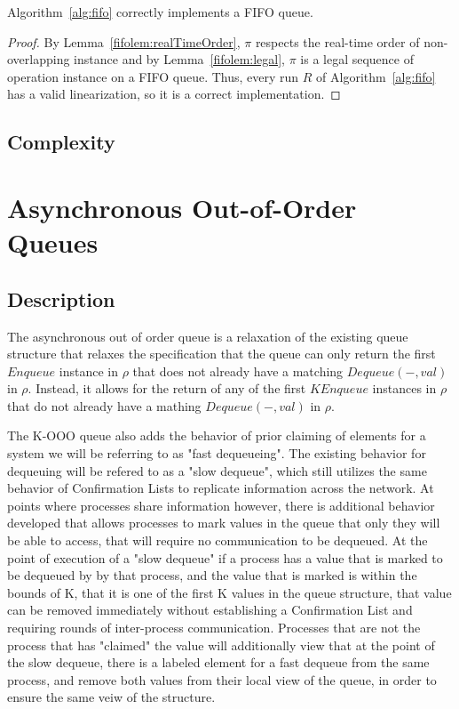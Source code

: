 \documentclass[a4paper,anonymous,USenglish]{lipics-v2021} %
\theoremstyle{definition}
\begin{document}
\begin{theorem}
  Algorithm~\ref{alg:fifo} correctly implements a FIFO queue.
\end{theorem}

\begin{proof}
  By Lemma~\ref{fifolem:realTimeOrder}, $\pi$ respects the real-time order of non-overlapping instance and by Lemma~\ref{fifolem:legal}, $\pi$ is a legal sequence of operation instance on a FIFO queue.  Thus, every run $R$ of Algorithm~\ref{alg:fifo} has a valid linearization, so it is a correct implementation.
\end{proof}

  

\subsection{Complexity}

\section{Asynchronous Out-of-Order Queues}

\subsection{Description}

The asynchronous out of order queue is a relaxation of the existing queue structure that relaxes the specification that the queue can only return the first $Enqueue$ instance in $\rho$ that does not already have a matching $Dequeue(-, val)$ in $\rho$. Instead, it allows for the return of any of the first $K Enqueue$ instances in $\rho$ that do not already have a mathing $Dequeue(-, val)$ in $\rho$. 

The K-OOO queue also adds the behavior of prior claiming of elements for a system we will be referring to as "fast dequeueing". The existing behavior for dequeuing will be refered to as a "slow dequeue", which still utilizes the same behavior of Confirmation Lists to replicate information across the network. At points where processes share information however, there is additional behavior developed that allows processes to mark values in the queue that only they will be able to access, that will require no communication to be dequeued. At the point of execution of a "slow dequeue" if a process has a value that is marked to be dequeued by by that process, and the value that is marked is within the bounds of K, that it is one of the first K values in the queue structure, that value can be removed immediately without establishing a Confirmation List and requiring rounds of inter-process communication. Processes that are not the process that has "claimed" the value will additionally view that at the point of the slow dequeue, there is a labeled element for a fast dequeue from the same process, and remove both values from their local view of the queue, in order to ensure the same veiw of the structure. 
\end{document}
